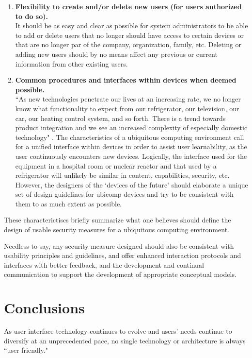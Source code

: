 \documentclass{article}
\begin{document}
\begin{enumerate}
 \item \textbf{Flexibility to create and/or delete new users (for users authorized to do so).}\\
 It should be as easy and clear as possible for system administrators to be able to add or delete users that no longer should have access to certain devices or that are no longer par of the company, organization, family, etc.  Deleting or adding new users should by no means affect any previous or current information from other existing users.

 \item \textbf{Common procedures and interfaces within devices when deemed possible.}\\
 ``As new technologies penetrate our lives at an increasing rate, we no longer know what functionality to expect from our refrigerator, our television, our car, our heating control system, and so forth. There is a trend towards product integration and we see an increased complexity of especially domestic technology" \cite{petersen2002usability}. The characteristics of a ubiquitous computing environment call for a unified interface within devices in order to assist user learnability, as the user continuously encounters new devices. Logically, the interface used for the equipment in a hospital room or nuclear reactor and that used by a refrigerator will unlikely be similar in content, capabilities, security, etc. However, the designers of the `devices of the future' should elaborate a unique set of design guidelines for ubicomp devices and try to be consistent with them to as much extent as possible. 
\end{enumerate}

These characterictiscs briefly summarize what one believes should define the design of usable security measures for a ubiquitous computing environment.  

Needless to say, any security measure designed should also be consistent with usability principles and guidelines, and offer enhanced interaction protocols and interfaces with better feedback, and the development and continual communication to support the development of appropriate conceptual models. 


\section{Conclusions}
As user-interface technology continues to evolve and users' needs continue to diversify at an unprecedented pace, no single technology or architecture is always ``user friendly." 
\end{document}
